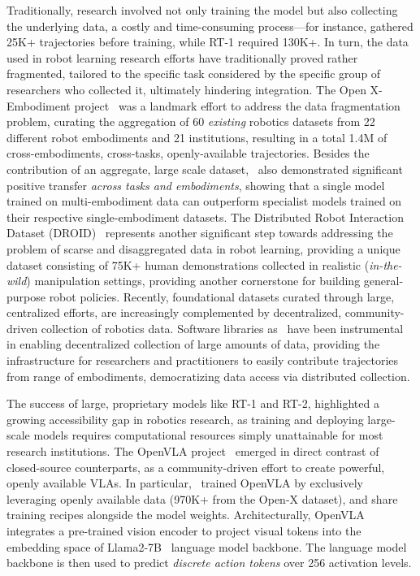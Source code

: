 Traditionally, research involved not only training the model but also collecting the underlying data, a costly and time-consuming process—for instance, \citet{jangBCZZeroShotTask2022} gathered 25K+ trajectories before training, while RT-1 required 130K+.
In turn, the data used in robot learning research efforts have traditionally proved rather fragmented, tailored to the specific task considered by the specific group of researchers who collected it, ultimately hindering integration.
The Open X-Embodiment project~\citep{collaborationOpenXEmbodimentRobotic2025} was a landmark effort to address the data fragmentation problem, curating the aggregation of 60 \emph{existing} robotics datasets from 22 different robot embodiments and 21 institutions, resulting in a total 1.4M of cross-embodiments, cross-tasks, openly-available trajectories.
Besides the contribution of an aggregate, large scale dataset,~\citet{collaborationOpenXEmbodimentRobotic2025} also demonstrated significant positive transfer \emph{across tasks and embodiments}, showing that a single model trained on multi-embodiment data can outperform specialist models trained on their respective single-embodiment datasets.
The Distributed Robot Interaction Dataset (DROID)~\citep{khazatskyDROIDLargeScaleInTheWild2025} represents another significant step towards addressing the problem of scarse and disaggregated data in robot learning, providing a unique dataset consisting of 75K+ human demonstrations collected in realistic (\emph{in-the-wild}) manipulation settings, providing another cornerstone for building general-purpose robot policies.
Recently, foundational datasets curated through large, centralized efforts, are increasingly complemented by decentralized, community-driven collection of robotics data.
Software libraries as \lerobot~have been instrumental in enabling decentralized collection of large amounts of data, providing the infrastructure for researchers and practitioners to easily contribute trajectories from range of embodiments, democratizing data access via distributed collection.

The success of large, proprietary models like RT-1 and RT-2, highlighted a growing accessibility gap in robotics research, as training and deploying large-scale models requires computational resources simply unattainable for most research institutions. 
The OpenVLA project~\citep{kimOpenVLAOpenSourceVisionLanguageAction2024} emerged in direct contrast of closed-source counterparts, as a community-driven effort to create powerful, openly available VLAs.
In particular,~\citet{kimOpenVLAOpenSourceVisionLanguageAction2024} trained OpenVLA by exclusively leveraging openly available data (970K+ from the Open-X dataset), and share training recipes alongside the model weights.
Architecturally, OpenVLA integrates a pre-trained vision encoder to project visual tokens into the embedding space of Llama2-7B~\citep{touvronLlama2Open2023} language model backbone.
The language model backbone is then used to predict \emph{discrete action tokens} over 256 activation levels.

